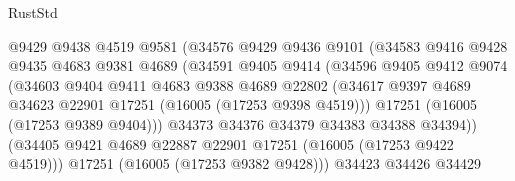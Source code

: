 \begin{lexlean}{RustStd}
\begin{coremodule}
                                @9429
                                @9438
                                @4519
                                @9581
                                (@34576
                                  @9429
                                  @9436
                                  @9101
                                  (@34583
                                    @9416
                                    @9428
                                    @9435
                                    @4683
                                    @9381
                                    @4689
                                    (@34591
                                      @9405
                                      @9414
                                      (@34596
                                        @9405
                                        @9412
                                        @9074
                                        (@34603
                                          @9404
                                          @9411
                                          @4683
                                          @9388
                                          @4689
                                          @22802
                                          (@34617
                                            @9397
                                            @4689
                                            @34623
                                            @22901
                                            @17251
                                            (@16005 (@17253 @9398 @4519)))
                                          @17251
                                          (@16005 (@17253 @9389 @9404)))
                                        @34373
                                        @34376
                                        @34379
                                        @34383
                                        @34388
                                        @34394))
                                    (@34405
                                      @9421
                                      @4689
                                      @22887
                                      @22901
                                      @17251
                                      (@16005 (@17253 @9422 @4519)))
                                    @17251
                                    (@16005 (@17253 @9382 @9428)))
                                  @34423
                                  @34426
                                  @34429

\end{coremodule}
\end{lexlean}
